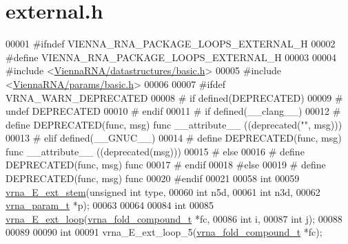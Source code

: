 \hypertarget{external_8h_source}{}\section{external.\+h}
\label{external_8h_source}

\begin{DoxyCode}
00001 \textcolor{preprocessor}{#ifndef VIENNA\_RNA\_PACKAGE\_LOOPS\_EXTERNAL\_H}
00002 \textcolor{preprocessor}{#define VIENNA\_RNA\_PACKAGE\_LOOPS\_EXTERNAL\_H}
00003 
00004 \textcolor{preprocessor}{#include <\hyperlink{datastructures_2basic_8h}{ViennaRNA/datastructures/basic.h}>}
00005 \textcolor{preprocessor}{#include <\hyperlink{params_2basic_8h}{ViennaRNA/params/basic.h}>}
00006 
00007 \textcolor{preprocessor}{#ifdef VRNA\_WARN\_DEPRECATED}
00008 \textcolor{preprocessor}{# if defined(DEPRECATED)}
00009 \textcolor{preprocessor}{#   undef DEPRECATED}
00010 \textcolor{preprocessor}{# endif}
00011 \textcolor{preprocessor}{# if defined(\_\_clang\_\_)}
00012 \textcolor{preprocessor}{#  define DEPRECATED(func, msg) func \_\_attribute\_\_ ((deprecated("", msg)))}
00013 \textcolor{preprocessor}{# elif defined(\_\_GNUC\_\_)}
00014 \textcolor{preprocessor}{#  define DEPRECATED(func, msg) func \_\_attribute\_\_ ((deprecated(msg)))}
00015 \textcolor{preprocessor}{# else}
00016 \textcolor{preprocessor}{#  define DEPRECATED(func, msg) func}
00017 \textcolor{preprocessor}{# endif}
00018 \textcolor{preprocessor}{#else}
00019 \textcolor{preprocessor}{# define DEPRECATED(func, msg) func}
00020 \textcolor{preprocessor}{#endif}
00021 
00058 \textcolor{keywordtype}{int}
00059 \hyperlink{group__eval__loops__ext_gaa0c313c90da11aa741dcd62746d85337}{vrna\_E\_ext\_stem}(\textcolor{keywordtype}{unsigned} \textcolor{keywordtype}{int}  type,
00060                 \textcolor{keywordtype}{int}           n5d,
00061                 \textcolor{keywordtype}{int}           n3d,
00062                 \hyperlink{group__energy__parameters_structvrna__param__s}{vrna\_param\_t}  *p);
00063 
00064 
00084 \textcolor{keywordtype}{int}
00085 \hyperlink{group__eval__loops__ext_gace51f32d5b34b7003b51c948afc6c207}{vrna\_E\_ext\_loop}(\hyperlink{group__fold__compound_structvrna__fc__s}{vrna\_fold\_compound\_t}  *fc,
00086                 \textcolor{keywordtype}{int}                   i,
00087                 \textcolor{keywordtype}{int}                   j);
00088 
00089 
00090 \textcolor{keywordtype}{int}
00091 vrna\_E\_ext\_loop\_5(\hyperlink{group__fold__compound_structvrna__fc__s}{vrna\_fold\_compound\_t} *fc);

\end{DoxyCode}
